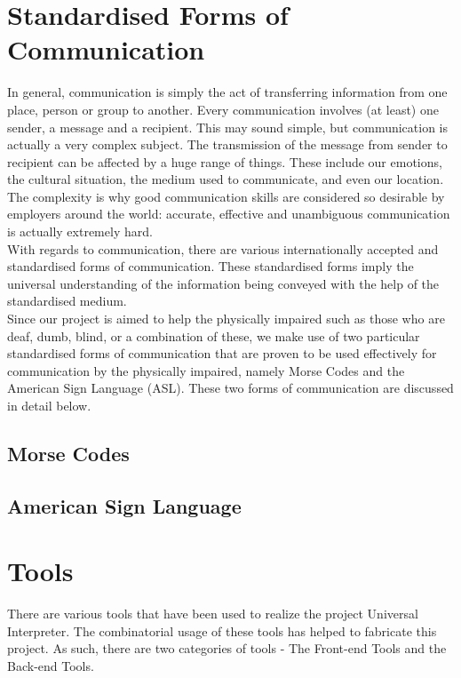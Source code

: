 \documentclass[14pt]{report}
\begin{document}
				\section{Standardised Forms of Communication}
				In general, communication is simply the act of transferring information from one place, person or group to another. Every communication involves (at least) one sender, a message and a recipient. This may sound simple, but communication is actually a very complex subject. The transmission of the message from sender to recipient can be affected by a huge range of things. These include our emotions, the cultural situation, the medium used to communicate, and even our location. The complexity is why good communication skills are considered so desirable by employers around the world: accurate, effective and unambiguous communication is actually extremely hard.\\

				With regards to communication, there are various internationally accepted and standardised forms of communication. These standardised forms imply the universal understanding of the information being conveyed with the help of the standardised medium.\\

				Since our project is aimed to help the physically impaired such as those who are deaf, dumb, blind, or a combination of these, we make use of two particular standardised forms of communication that are proven to be used effectively for communication by the physically impaired, namely Morse Codes and the American Sign Language (ASL). These two forms of communication are discussed in detail below. 
			\subsection{Morse Codes}
			\subsection{American Sign Language}
		\section{Tools}
			There are various tools that have been used to realize the project Universal Interpreter. The combinatorial usage of these tools has helped to fabricate this project. As such, there are two categories of tools - The Front-end Tools and the Back-end Tools. \\
			
\end{document}
